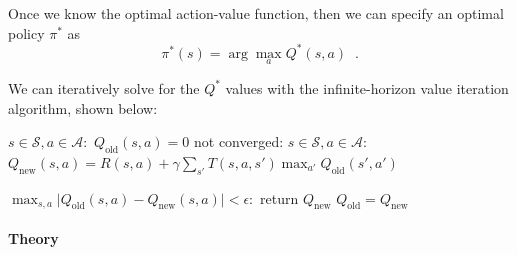 Once we know the optimal action-value function, then we can specify an
optimal policy $\pi^*$ as
\begin{equation}
  \pi^*(s) = \arg\max_{a}Q^*(s, a) \;\;.
\end{equation}

We can iteratively solve for the $Q^*$ values with the
infinite-horizon value iteration algorithm, shown below:

\begin{codebox}
  \li     \For $s \in \mathcal{S}, a \in \mathcal{A}:$
  \Do
  \li        $Q_{\text{old}}(s, a) = 0$
  \End
  \li     \While not converged:
  \Do
  \li        \For $s \in \mathcal{S}, a \in \mathcal{A}:$
  \Do
  \li           $Q_{\text{new}}(s, a) = R(s, a) + \gamma\sum_{s'}T(s, a, s')\max_{a'}Q_{\text{old}}(s', a')$
  \End

  \li      \If $\max_{s, a}\lvert Q_{\text{old}}(s, a) - Q_{\text{new}}(s, a)\rvert < \epsilon:$
  \Do
  \li           return $Q_{\text{new}}$
  \End
  \li      $Q_{\text{old}} = Q_{\text{new}}$
  \End
\end{codebox}

\paragraph*{Theory}

